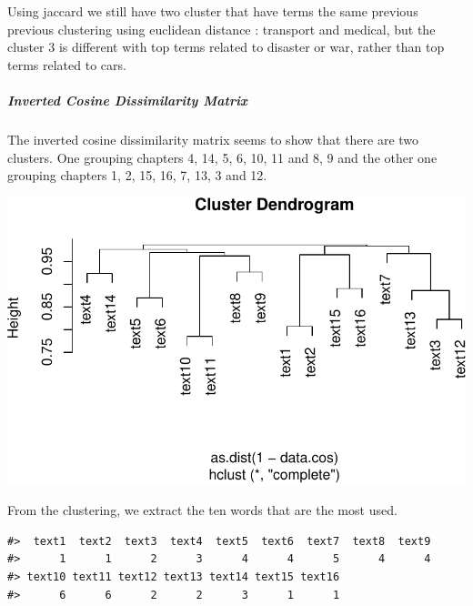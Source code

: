 \documentclass[
]{article}
\begin{document}
Using jaccard we still have two cluster that have terms the same
previous previous clustering using euclidean distance : transport and
medical, but the cluster 3 is different with top terms related to
disaster or war, rather than top terms related to cars.

\hypertarget{inverted-cosine-dissimilarity-matrix}{%
\subparagraph{Inverted Cosine Dissimilarity
Matrix}\label{inverted-cosine-dissimilarity-matrix}}

The inverted cosine dissimilarity matrix seems to show that there are
two clusters. One grouping chapters 4, 14, 5, 6, 10, 11 and 8, 9 and the
other one grouping chapters 1, 2, 15, 16, 7, 13, 3 and 12.

\begin{center}\includegraphics[width=0.7\linewidth]{report_files/figure-latex/cosine inverted-1} \end{center}

From the clustering, we extract the ten words that are the most used.

\begin{verbatim}
#>  text1  text2  text3  text4  text5  text6  text7  text8  text9 
#>      1      1      2      3      4      4      5      4      4 
#> text10 text11 text12 text13 text14 text15 text16 
#>      6      6      2      2      3      1      1
\end{verbatim}
\end{document}
